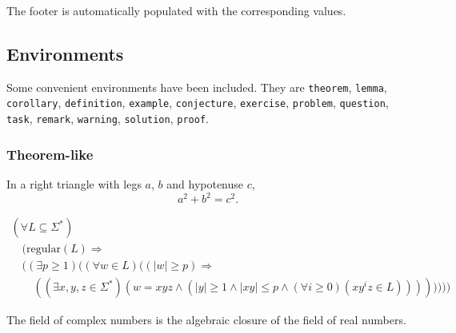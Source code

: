\documentclass{article}
\theoremstyle{plain}
\theoremstyle{definition}
\theoremstyle{remark}
\newcommand{\myname}{Jeffrey Zhang}
\newcommand{\myandrewid}{jczhang}
\newcommand{\mydate}{\today}
\newcommand{\mycourse}{15-359 A: Probability and Computing}
\newcommand{\myhwname}{\LaTeX{} Template}
\newcommand{\mynote}{Collaborators: none}
\begin{document}
\begin{latexcode}
\newcommand{\myname}{Jeffrey Zhang}
\newcommand{\myandrewid}{jczhang}
\newcommand{\mydate}{\today}
\newcommand{\mycourse}{15-359 A: Probability and Computing}
\newcommand{\myhwname}{\LaTeX{} Template}
\newcommand{\mynote}{Collaborators: none}
\end{latexcode}

The footer is automatically populated with the corresponding values.

\subsection{Environments}

Some convenient environments have been included. They are \texttt{theorem}, \texttt{lemma}, \texttt{corollary}, \texttt{definition}, \texttt{example}, \texttt{conjecture}, \texttt{exercise}, \texttt{problem}, \texttt{question}, \texttt{task}, \texttt{remark}, \texttt{warning}, \texttt{solution}, \texttt{proof}.

\subsubsection{Theorem-like}

\begin{theorem}
In a right triangle with legs $a$, $b$ and hypotenuse $c$,
$$a^2 + b^2 = c^2.$$
\end{theorem}

\begin{lemma}
$$\begin{array}{l}
(\forall  L\subseteq \Sigma^*)  \\
\quad      (\mbox{regular}(L) \Rightarrow \\                            
\quad      ((\exists p\geq 1) ( (\forall w\in L) ((|w|\geq p) \Rightarrow \\
\quad\quad ((\exists x,y,z \in \Sigma^*) (w=xyz \land (|y|\geq 1 \land |xy|\leq p \land
(\forall i\geq 0)(xy^iz\in L))))))))
\end{array}$$
\end{lemma}

\begin{corollary}
The field of complex numbers is the algebraic closure of the field of real numbers.
\end{corollary}
\end{document}
